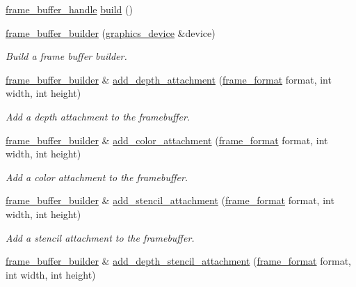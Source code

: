 \begin{DoxyCompactItemize}
\item 
\mbox{\hyperlink{structmoka_1_1frame__buffer__handle}{frame\+\_\+buffer\+\_\+handle}} \mbox{\hyperlink{structmoka_1_1frame__buffer__builder_a4923409d41757735101a7dd636286693}{build}} ()
\item 
\mbox{\hyperlink{structmoka_1_1frame__buffer__builder_ae89d036ae7b2e0b0961069ae320b9657}{frame\+\_\+buffer\+\_\+builder}} (\mbox{\hyperlink{classmoka_1_1graphics__device}{graphics\+\_\+device}} \&device)
\begin{DoxyCompactList}\small\item\em Build a frame buffer builder. \end{DoxyCompactList}\item 
\mbox{\hyperlink{structmoka_1_1frame__buffer__builder}{frame\+\_\+buffer\+\_\+builder}} \& \mbox{\hyperlink{structmoka_1_1frame__buffer__builder_a067deb066a108ea267a66a5eb5686f47}{add\+\_\+depth\+\_\+attachment}} (\mbox{\hyperlink{namespacemoka_a2ce6b5e22cd8e423713ef76033a279de}{frame\+\_\+format}} format, int width, int height)
\begin{DoxyCompactList}\small\item\em Add a depth attachment to the framebuffer. \end{DoxyCompactList}\item 
\mbox{\hyperlink{structmoka_1_1frame__buffer__builder}{frame\+\_\+buffer\+\_\+builder}} \& \mbox{\hyperlink{structmoka_1_1frame__buffer__builder_a179cef77efbe28a2a95b4fe450f1b0e6}{add\+\_\+color\+\_\+attachment}} (\mbox{\hyperlink{namespacemoka_a2ce6b5e22cd8e423713ef76033a279de}{frame\+\_\+format}} format, int width, int height)
\begin{DoxyCompactList}\small\item\em Add a color attachment to the framebuffer. \end{DoxyCompactList}\item 
\mbox{\hyperlink{structmoka_1_1frame__buffer__builder}{frame\+\_\+buffer\+\_\+builder}} \& \mbox{\hyperlink{structmoka_1_1frame__buffer__builder_a36db9cf28c64751f50b65b09df374734}{add\+\_\+stencil\+\_\+attachment}} (\mbox{\hyperlink{namespacemoka_a2ce6b5e22cd8e423713ef76033a279de}{frame\+\_\+format}} format, int width, int height)
\begin{DoxyCompactList}\small\item\em Add a stencil attachment to the framebuffer. \end{DoxyCompactList}\item 
\mbox{\hyperlink{structmoka_1_1frame__buffer__builder}{frame\+\_\+buffer\+\_\+builder}} \& \mbox{\hyperlink{structmoka_1_1frame__buffer__builder_a0a684c0c35ba9c52ca88b8744f4659d9}{add\+\_\+depth\+\_\+stencil\+\_\+attachment}} (\mbox{\hyperlink{namespacemoka_a2ce6b5e22cd8e423713ef76033a279de}{frame\+\_\+format}} format, int width, int height)

\end{DoxyCompactItemize}
